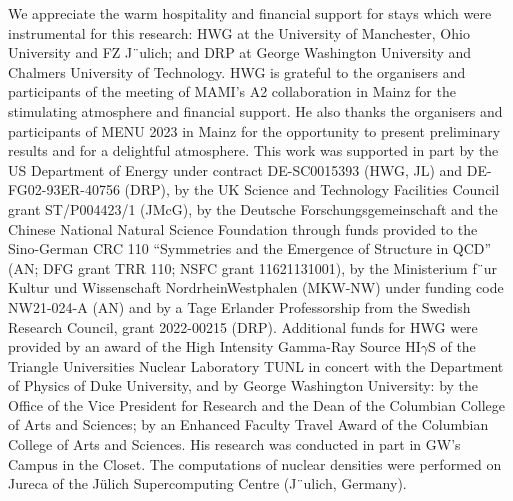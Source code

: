 \documentclass[a4paper,11pt]{article}
\begin{document}
We appreciate the warm hospitality and
financial support for stays which were instrumental for this research: HWG at the University
of Manchester, Ohio University and FZ J¨ulich; and DRP at George Washington University
and Chalmers University of Technology. HWG is grateful to the organisers and participants
of the meeting of MAMI’s A2 collaboration in Mainz for the stimulating atmosphere and
financial support. He also thanks the organisers and participants of MENU 2023 in Mainz
for the opportunity to present preliminary results and for a delightful atmosphere. This
work was supported in part by the US Department of Energy under contract DE-SC0015393
(HWG, JL) and DE-FG02-93ER-40756 (DRP), by the UK Science and Technology Facilities
Council grant ST/P004423/1 (JMcG), by the Deutsche Forschungsgemeinschaft and the
Chinese National Natural Science Foundation through funds provided to the Sino-German
CRC 110 “Symmetries and the Emergence of Structure in QCD” (AN; DFG grant TRR 110;
NSFC grant 11621131001), by the Ministerium f¨ur Kultur und Wissenschaft NordrheinWestphalen (MKW-NW) under funding code NW21-024-A (AN) and by a Tage Erlander
Professorship from the Swedish Research Council, grant 2022-00215 (DRP). Additional
funds for HWG were provided by an award of the High Intensity Gamma-Ray Source HI$\gamma$S
of the Triangle Universities Nuclear Laboratory TUNL in concert with the Department of
Physics of Duke University, and by George Washington University: by the Office of the
Vice President for Research and the Dean of the Columbian College of Arts and Sciences;
by an Enhanced Faculty Travel Award of the Columbian College of Arts and Sciences.
His research was conducted in part in GW’s Campus in the Closet. The computations of
nuclear densities were performed on Jureca of the J{\"u}lich Supercomputing Centre (J¨ulich,
Germany).
\end{document}
